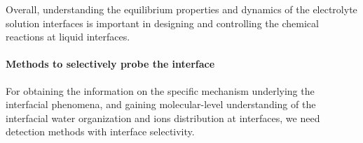 Overall, understanding the equilibrium properties and dynamics of the electrolyte solution interfaces 
is important in designing and controlling the chemical reactions at liquid interfaces.

\paragraph{Methods to selectively probe the interface}
For obtaining the information on the specific mechanism underlying the interfacial phenomena,
and gaining molecular-level understanding of the interfacial water organization and ions distribution at interfaces,
we need detection methods with interface selectivity. 

